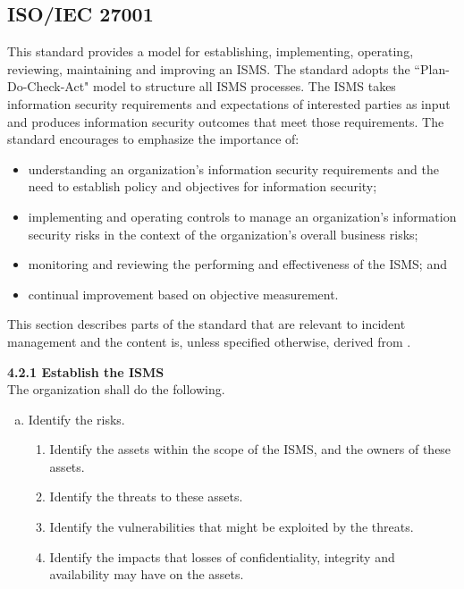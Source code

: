 \subsection{\acs{ISO}/\acs{IEC} 27001}
\label{sec:iso27001}
This standard provides a model for establishing, implementing, operating, reviewing, maintaining and improving an \ac{ISMS}. The standard adopts the ``Plan-Do-Check-Act" model to structure all \ac{ISMS} processes. The \ac{ISMS} takes information security requirements and expectations of interested parties as input and produces information security outcomes that meet those requirements. The standard encourages to emphasize the importance of:
\begin{itemize}\itemsep-0.2cm
\item understanding an organization's information security requirements and the need to establish policy and objectives for information security;
\item implementing and operating controls to manage an organization's information security risks in the context of the organization's overall business risks;
\item monitoring and reviewing the performing and effectiveness of the \ac{ISMS}; and
\item continual improvement based on objective measurement.
\end{itemize}

This section describes parts of the standard that are relevant to incident management and the content is, unless specified otherwise, derived from \cite{ISO/IEC27001}.

\textbf{4.2.1 Establish the \ac{ISMS} } \\
The organization shall do the following.
\begin{enumerate}[d)]
\item Identify the risks.
\begin{enumerate}[1)]\itemsep-0.2cm
\item Identify the assets within the scope of the \ac{ISMS}, and the owners of these assets.
\item Identify the threats to these assets.
\item Identify the vulnerabilities that might be exploited by the threats.
\item Identify the impacts that losses of confidentiality, integrity and availability may have on the assets.
\end{enumerate}
\end{enumerate}

